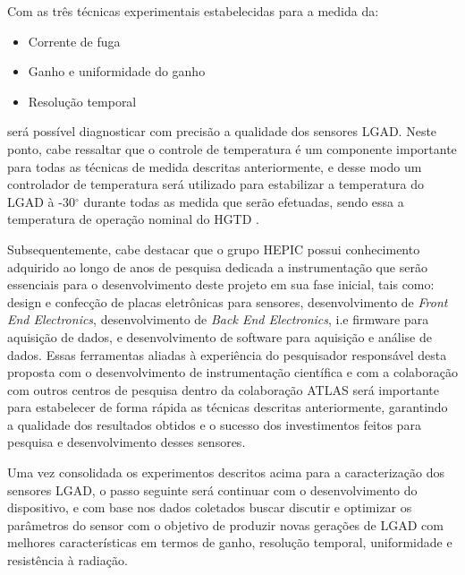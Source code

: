 
Com as três técnicas experimentais estabelecidas para a medida da:

\begin{itemize}
\item Corrente de fuga
\item Ganho e uniformidade do ganho
\item Resolução temporal 
\end{itemize}
será possível diagnosticar com precisão a qualidade dos sensores LGAD. Neste ponto, cabe ressaltar que o controle de temperatura é um componente importante para todas as técnicas de medida descritas anteriormente, e desse modo um controlador de temperatura será utilizado para estabilizar a temperatura do LGAD à -30$^{\circ}$ durante todas as medida que serão efetuadas, sendo essa a temperatura de operação nominal do HGTD \cite{tdr}.

\thispagestyle{plain}

Subsequentemente, cabe destacar que o grupo HEPIC possui conhecimento adquirido ao longo de anos de pesquisa dedicada a instrumentação que serão essenciais para o desenvolvimento deste projeto em sua fase inicial, tais como: design e confecção de placas eletrônicas para sensores, desenvolvimento de {\it Front End Electronics}, desenvolvimento de {\it Back End Electronics}, i.e firmware para aquisição de dados, e desenvolvimento de software para aquisição e análise de dados. Essas ferramentas aliadas à experiência do pesquisador responsável desta proposta com o desenvolvimento de instrumentação científica \cite{tpcNIM,discharge_paper,GSI_REPO,THGEM} e com a colaboração com outros centros de pesquisa dentro da colaboração ATLAS será importante para estabelecer de forma rápida as técnicas descritas anteriormente, garantindo a qualidade dos resultados obtidos e o sucesso dos investimentos feitos para pesquisa e desenvolvimento desses sensores. 
\thispagestyle{plain}

Uma vez consolidada os experimentos descritos acima para a caracterização dos sensores LGAD, o passo seguinte será continuar com o desenvolvimento do dispositivo, e com base nos dados coletados buscar discutir e optimizar os parâmetros do sensor com o objetivo de produzir novas gerações de LGAD com melhores características em termos de ganho, resolução temporal, uniformidade e resistência à radiação. 

